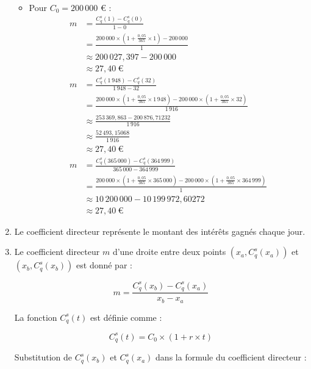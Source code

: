 \documentclass{article}
\begin{document}
\begin{enumerate}[label=\textbf{R1.\arabic*}]
\begin{itemize}
        \item Pour \( C_0 = 200\,000 \) € :
        \[
            \begin{aligned}
            m &= \frac{C^s_q(1) - C^s_q(0)}{1 - 0} \\
              &= \frac{200\,000 \times \left(1 + \frac{0{,}05}{365} \times 1\right) - 200\,000}{1} \\
              &\approx 200\,027{,}397 - 200\,000 \\
              &\approx 27{,}40\ \text{€} \\[1em]
            m &= \frac{C^s_q(1\,948) - C^s_q(32)}{1\,948 - 32} \\
              &= \frac{200\,000 \times \left(1 + \frac{0{,}05}{365} \times 1\,948\right) - 200\,000 \times \left(1 + \frac{0{,}05}{365} \times 32\right)}{1\,916} \\
              &\approx \frac{253\,369{,}863 - 200\,876{,}71232}{1\,916} \\
              &\approx \frac{52\,493{,}15068}{1\,916} \\
              &\approx 27{,}40\ \text{€} \\[1em]
            m &= \frac{C^s_q(365\,000) - C^s_q(364\,999)}{365\,000 - 364\,999} \\
              &= \frac{200\,000 \times \left(1 + \frac{0{,}05}{365} \times 365\,000\right) - 200\,000 \times \left(1 + \frac{0{,}05}{365} \times 364\,999\right)}{1} \\
              &\approx 10\,200\,000 - 10\,199\,972,60272 \\
              &\approx 27{,}40\ \text{€}
            \end{aligned}
        \]
    \end{itemize}

    \item Le coefficient directeur représente le montant des intérêts gagnés chaque jour.

    \item Le coefficient directeur \( m \) d'une droite entre deux points \((x_a, C_q^s(x_a))\) et \((x_b, C_q^s(x_b))\) est donné par :
    
    \[
    m = \frac{C_q^s(x_b) - C_q^s(x_a)}{x_b - x_a}
    \]
    
    La fonction \( C_q^s(t) \) est définie comme :
    
    \[
    C_q^s(t) = C_0 \times \left(1 + r \times t\right)
    \]
        
    Substitution de \( C_q^s(x_b) \) et \( C_q^s(x_a) \) dans la formule du coefficient directeur :
    

\end{enumerate}
\end{document}
